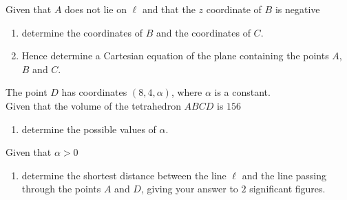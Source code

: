 \documentclass[leqno]{article}
\begin{document}
\begin{enumerate}[
  label=\textbf{\arabic*.},
  leftmargin=*,
  topsep=0pt,
  partopsep=0pt,
  parsep=0pt
]
Given that $A$ does not lie on $\ell$ and that the $z$ coordinate of $B$ is negative \\

\begin{enumerate}[label=\textbf{(\alph*)}]
  \item determine the coordinates of $B$ and the coordinates of $C$.  \\
  \item Hence determine a Cartesian equation of the plane containing the points $A$, $B$ and $C$.  \\
\end{enumerate}
The point $D$ has coordinates $(8,4,\alpha)$, where $\alpha$ is a constant. \\

Given that the volume of the tetrahedron $ABCD$ is $156$ \\

\begin{enumerate}[label=\textbf{(\alph*)}, resume]
  \item determine the possible values of $\alpha$.  \\
\end{enumerate}
Given that $\alpha>0$ \\

\begin{enumerate}[label=\textbf{(\alph*)}, resume]
  \item determine the shortest distance between the line $\ell$ and the line passing through the points $A$ and $D$, giving your answer to $2$ significant figures.  \\
\end{enumerate}


\end{enumerate}
\end{document}
